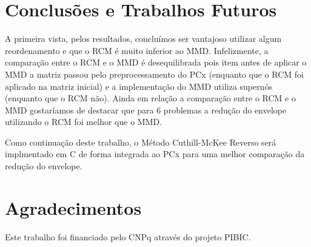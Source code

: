 \section{Conclusões e Trabalhos Futuros}
A primeira vista, pelos resultados, concluímos ser vantajoso utilizar algum
reordenamento e que o RCM é muito inferior ao MMD. Infelizmente, a comparação
entre o RCM e o MMD é desequilibrada pois
item antes de aplicar o MMD a matriz passou pelo preprocessamento do PCx (enquanto
que o RCM foi aplicado na matriz inicial) e
a implementação do MMD utiliza supernós (enquanto que o RCM não).
Ainda em relação a comparação entre o RCM e o MMD gostaríamos de destacar que
para 6 problemas a redução do envelope utilizando o RCM foi melhor que o MMD.

Como continuação deste trabalho, o Método Cuthill-McKee Reverso será implmentado
em C de forma integrada ao PCx para uma melhor comparação da redução do envelope.

\section*{Agradecimentos}
Este trabalho foi financiado pelo CNPq através do projeto PIBIC.
